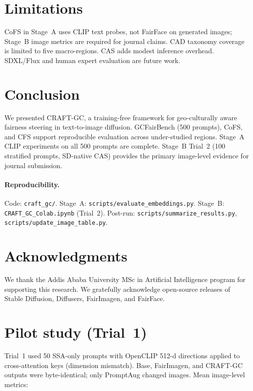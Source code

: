 \documentclass[11pt,a4paper]{article}
\begin{document}
\section{Limitations}
\label{sec:limitations}

CoFS in Stage~A uses CLIP text probes, not FairFace on generated images; Stage~B image metrics are required for journal claims. CAD taxonomy coverage is limited to five macro-regions. CAS adds modest inference overhead. SDXL/Flux and human expert evaluation are future work.

\section{Conclusion}
\label{sec:conclusion}

We presented CRAFT-GC, a training-free framework for geo-culturally aware fairness steering in text-to-image diffusion. GCFairBench (500 prompts), CoFS, and CFS support reproducible evaluation across under-studied regions. Stage~A CLIP experiments on all 500 prompts are complete. Stage~B Trial~2 (100 stratified prompts, SD-native CAS) provides the primary image-level evidence for journal submission.

\paragraph{Reproducibility.}
Code: \texttt{craft\_gc/}. Stage~A: \texttt{scripts/evaluate\_embeddings.py}. Stage~B: \texttt{CRAFT\_GC\_Colab.ipynb} (Trial~2). Post-run: \texttt{scripts/summarize\_results.py}, \texttt{scripts/update\_image\_table.py}.

\section*{Acknowledgments}
We thank the Addis Ababa University MSc in Artificial Intelligence program for supporting this research. We gratefully acknowledge open-source releases of Stable Diffusion, Diffusers, FairImagen, and FairFace.




\appendix

\section{Pilot study (Trial~1)}
\label{app:trial1}

Trial~1 used 50 SSA-only prompts with OpenCLIP 512-d directions applied to cross-attention keys (dimension mismatch). Base, FairImagen, and CRAFT-GC outputs were byte-identical; only PromptAug changed images. Mean image-level metrics:
\end{document}
